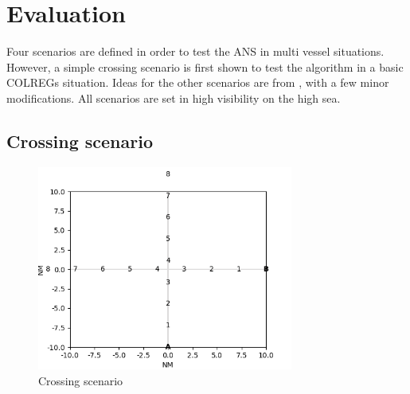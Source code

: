 \chapter{Evaluation}%


\label{sec:evaluation}
Four scenarios are defined in order to test the ANS in multi vessel situations. However, a simple crossing scenario is first shown to test the algorithm in a basic COLREGs situation. Ideas for the other scenarios are from \textcite{ecolreg_overtaking-and-crossing-2,ecolreg_overtaking-and-crossing-3,ecolreg_overtaking-and-crossing,ecolreg_overtaking-and-head-on}, with a few minor modifications. All scenarios are set in high visibility on the high sea.



\section{Crossing scenario}%


\begin{figure}[H]
    \centering
    \includegraphics[width=0.75\textwidth,height=0.75\textheight,keepaspectratio]{../src/img/crossing.png}
    \caption{Crossing scenario}
    \label{fig:simple-scen}
\end{figure}

